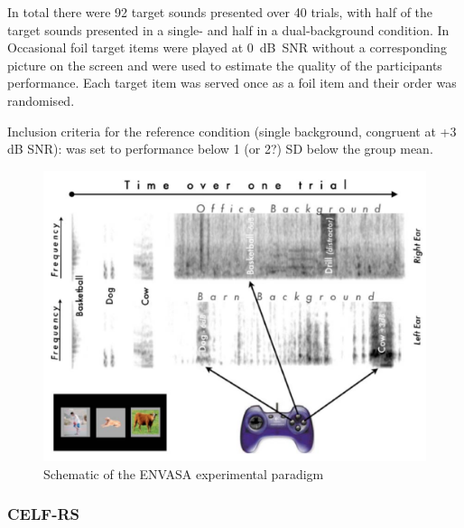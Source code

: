 \documentclass[a4paper, twoside]{templates/ociamthesis}
\begin{document}
In total there were 92 target sounds presented over 40 trials, with half of the target sounds presented in a single- and half in a dual-background condition. In Occasional foil target items were played at 0~dB~SNR without a corresponding picture on the screen and were used to estimate the quality of the participants performance. Each target item was served once as a foil item and their order was randomised.

Inclusion criteria for the reference condition (single background, congruent at +3 dB SNR): was set to performance below 1 (or 2?) SD below the group mean.



\begin{figure}

{\centering \includegraphics[width=0.65\linewidth]{figures/ENVASAparadigm} 

}

\caption{Schematic of the ENVASA experimental paradigm \autocite[taken from][]{Leech2009}}\label{fig:ENVASA}
\end{figure}

\hypertarget{celf-rs}{%
\subsubsection{CELF-RS}\label{celf-rs}}
\end{document}
